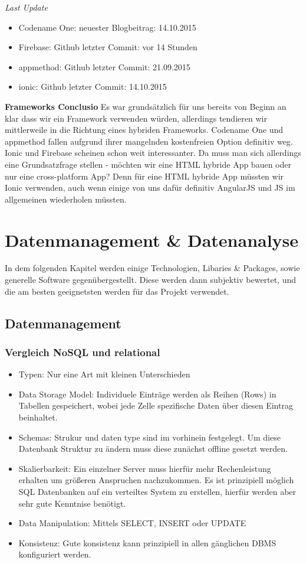 \textit{Last Update}
\begin{itemize}
\item Codename One: neuester Blogbeitrag: 14.10.2015
\item Firebase: Github letzter Commit: vor 14 Stunden
\item appmethod: Github letzter Commit: 21.09.2015
\item ionic: Github letzter Commit: 14.10.2015
\end{itemize}

\textbf{Frameworks Conclusio}
Es war grundsätzlich für uns bereits von Beginn an klar dass wir ein Framework verwenden würden, allerdings tendieren wir mittlerweile in die Richtung eines hybriden Frameworks. Codename One und appmethod fallen aufgrund ihrer mangelnden kostenfreien Option definitiv weg. Ionic und Firebase scheinen schon weit interessanter.
Da muss man sich allerdings eine Grundsatzfrage stellen - möchten wir eine HTML hybride App bauen oder nur eine cross-platform App? Denn für eine HTML hybride App müssten wir Ionic verwenden, auch wenn einige von uns dafür definitiv AngularJS und JS im allgemeinen wiederholen müssten.

\newpage
\section{Datenmanagement \& Datenanalyse}

In dem folgenden Kapitel werden einige Technologien, Libaries & Packages, sowie generelle Software gegenübergestellt. Diese werden dann subjektiv bewertet, und die am besten geeignetsten werden für das Projekt verwendet.

\subsection{Datenmanagement}

\subsubsection{Vergleich NoSQL und relational}
\begin{itemize}
\item Typen: Nur eine Art mit kleinen Unterschieden
\item Data Storage Model: Individuele Einträge werden als Reihen (Rows) in Tabellen gespeichert, wobei jede Zelle spezifische Daten über diesen Eintrag beinhaltet. 
\item Schemas: Strukur und daten type sind im vorhinein festgelegt. Um diese Datenbank Struktur zu ändern muss diese zunächst offline gesetzt werden.
\item Skalierbarkeit: Ein einzelner Server muss hierfür mehr Rechenleistung erhalten um größeren Anspruchen nachzukommen. Es ist prinzipiell möglich SQL Datenbanken auf ein verteiltes System zu erstellen, hierfür werden aber sehr gute Kenntnise benötigt.
\item Data Manipulation: Mittels SELECT, INSERT oder UPDATE
\item Konsistenz: Gute konsistenz kann prinzipiell in allen gänglichen DBMS konfiguriert werden.
\end{itemize}

